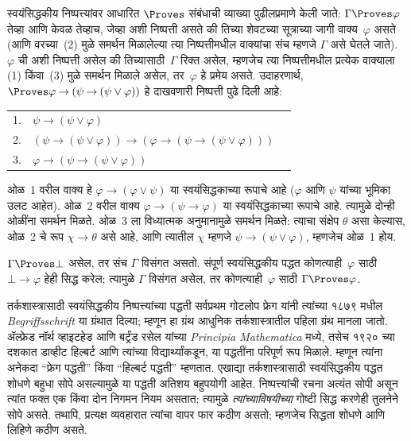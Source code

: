 \documentclass[11pt,a4paper,openany]{book}
\makeatletter
\theoremstyle{definition}
\newcommand{\lif}{\mathbin{\to}}
\newcommand{\lfalse}{\bot}
\newenvironment{derivation}{~\begin{trivlist}\item\begin{tabular}[b]{@{}rll@{}}}{\end{tabular}\end{trivlist}}
\makeatother
\begin{document}
स्वयंसिद्धकीय निष्पत्त्यांवर आधारित $\Proves$ संबंधाची व्याख्या
पुढीलप्रमाणे केली जाते: $\Gamma \Proves \varphi$ तेव्हा आणि केवळ तेव्हाच, जेव्हा
अशी निष्पत्ती असते की तिच्या शेवटच्या सूत्राच्या जागी
वाक्य~$\varphi$ असते (आणि वरच्या~(2) मुळे समर्थन मिळालेल्या त्या
निष्पत्तीमधील वाक्यांचा संच म्हणजे $\Gamma$ असे घेतले जाते).
~$\varphi$ ची अशी निष्पत्ती असेल की तिच्यासाठी~$\Gamma$ रिक्त असेल, म्हणजेच
त्या निष्पत्तीमधील प्रत्येक वाक्याला (1) किंवा~(3) मुळे समर्थन
मिळाले असेल, तर~$\varphi$ हे प्रमेय असते. उदाहरणार्थ, $\Proves
\varphi  \lif (\psi \lif (\psi \lor \varphi))$ हे दाखवणारी निष्पत्ती पुढे दिली आहे:
\begin{derivation}
  1. & $\psi \lif (\psi \lor \varphi)$ \\
  2. & $(\psi \lif (\psi \lor \varphi)) \lif (\varphi  \lif (\psi \lif (\psi \lor \varphi)))$\\
  3. & $\varphi  \lif (\psi \lif (\psi \lor \varphi))$
\end{derivation}
ओळ~1 वरील वाक्य हे $\varphi \lif (\varphi \lor \psi)$ या स्वयंसिद्धकाच्या
रूपाचे आहे ($\varphi$ आणि $\psi$ यांच्या भूमिका उलट आहेत). ओळ~2 वरील वाक्य
$\varphi \lif (\psi \lif \varphi)$ या स्वयंसिद्धकाच्या रूपाचे आहे. त्यामुळे दोन्ही
ओळींना समर्थन मिळते. ओळ~3 ला विध्यात्मक अनुमानामुळे समर्थन मिळते: त्याचा
संक्षेप $\theta$ असा केल्यास, ओळ~2 चे रूप $\chi \lif \theta$ असे आहे, आणि त्यातील
$\chi$ म्हणजे $\psi \lif (\psi \lor \varphi)$, म्हणजेच ओळ~1 होय.

$\Gamma \Proves \lfalse$ असेल, तर संच $\Gamma$ विसंगत असतो. संपूर्ण
स्वयंसिद्धकीय पद्धत कोणत्याही~$\varphi$ साठी $\lfalse \lif \varphi$ हेही सिद्ध करेल;
त्यामुळे $\Gamma$ विसंगत असेल, तर कोणत्याही~$\varphi$ साठी $\Gamma \Proves \varphi$.

तर्कशास्त्रासाठी स्वयंसिद्धकीय निष्पत्त्यांच्या पद्धती सर्वप्रथम गोटलोप
फ्रेग यांनी त्यांच्या १८७९ मधील \emph{Begriffsschrift} या ग्रंथात दिल्या;
म्हणून हा ग्रंथ आधुनिक तर्कशास्त्रातील पहिला ग्रंथ मानला जातो. ॲल्फ्रेड
नॉर्थ व्हाइटहेड आणि बर्ट्रंड रसेल यांच्या \emph{Principia Mathematica} मध्ये,
तसेच १९२० च्या दशकात डाव्हीट हिल्बर्ट आणि त्यांच्या विद्यार्थ्यांकडून, या
पद्धतींना परिपूर्ण रूप मिळाले. म्हणून त्यांना अनेकदा ``फ्रेग पद्धती'' किंवा
``हिल्बर्ट पद्धती'' म्हणतात. एखाद्या तर्कशास्त्रासाठी स्वयंसिद्धकीय पद्धत
शोधणे बहुधा सोपे असल्यामुळे या पद्धती अतिशय बहुपयोगी आहेत. निष्पत्त्यांची रचना अत्यंत सोपी असून त्यांत फक्त एक किंवा दोन निगमन नियम असतात;
त्यामुळे \emph{त्यांच्याविषयीच्या} गोष्टी सिद्ध करणेही तुलनेने सोपे असते. तथापि,
प्रत्यक्ष व्यवहारात त्यांचा वापर फार कठीण असतो; म्हणजेच सिद्धता शोधणे आणि
लिहिणे कठीण असते.
\end{document}
